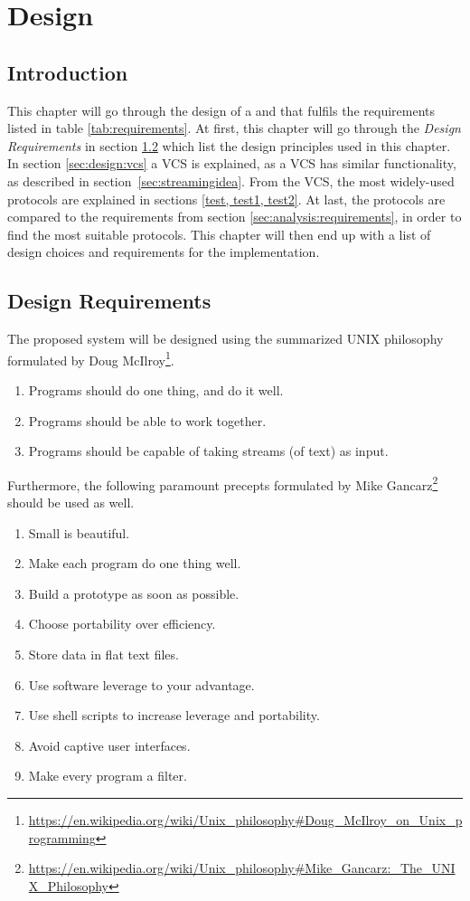 \chapter{Design} \label{chp:design}

\section{Introduction}
This chapter will go through the design of a  and  that fulfils the requirements listed in table \ref{tab:requirements}.
At first, this chapter will go through the \textit{Design Requirements} in section \ref{sec:design:requirements} which list the design principles used in this chapter.
In section \ref{sec:design:vcs} a \ac{VCS} is explained, as a \ac{VCS} has similar functionality, as described in section~\ref{sec:streamingidea}.
From the \ac{VCS}, the most widely-used protocols are explained in sections \cref{test, test1, test2}.
At last, the protocols are compared to the requirements from section \ref{sec:analysis:requirements}, in order to find the most suitable protocols.
This chapter will then end up with a list of design choices and requirements for the implementation.

\section{Design Requirements} \label{sec:design:requirements}
The proposed system will be designed using the summarized UNIX philosophy formulated by Doug McIlroy\footnote{\url{https://en.wikipedia.org/wiki/Unix_philosophy\#Doug_McIlroy_on_Unix_programming}}.  

\begin{enumerate}[{(a)}]	
\item Programs should do one thing, and do it well.
	\item Programs should be able to work together.
	\item Programs should be capable of taking streams (of text) as input.
\end{enumerate}

\noindent Furthermore, the following paramount precepts formulated by Mike Gancarz\footnote{\url{https://en.wikipedia.org/wiki/Unix_philosophy\#Mike_Gancarz:_The_UNIX_Philosophy}} should be used as well.
\begin{enumerate}[{(A)}]
	\item Small is beautiful.
	\item Make each program do one thing well.
	\item Build a prototype as soon as possible.
	\item Choose portability over efficiency.
	\item Store data in flat text files.
	\item Use software leverage to your advantage.
	\item Use shell scripts to increase leverage and portability.
	\item Avoid captive user interfaces.
	\item Make every program a filter.
\end{enumerate}

